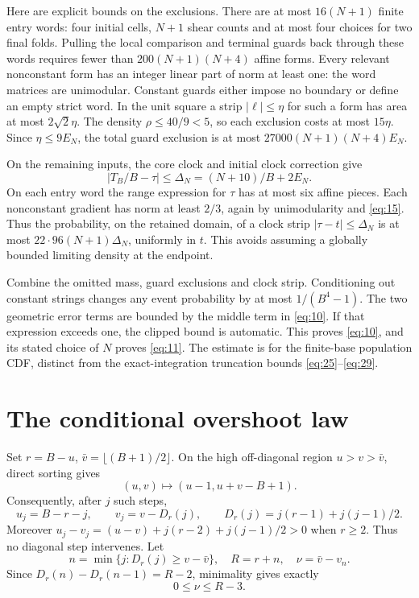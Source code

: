 \documentclass[11pt]{amsart}
\begin{document}
Here are explicit bounds on the exclusions. There are at most \(16(N+1)\) finite entry words: four initial cells, \(N+1\) shear counts and at most four choices for two final folds. Pulling the local comparison and terminal guards back through these words requires fewer than \(200(N+1)(N+4)\) affine forms. Every relevant nonconstant form has an integer linear part of norm at least one: the word matrices are unimodular. Constant guards either impose no boundary or define an empty strict word. In the unit square a strip \(|\ell|\le\eta\) for such a form has area at most \(2\sqrt2\eta\). The density \(\rho\le40/9<5\), so each exclusion costs at most \(15\eta\). Since \(\eta\le9E_N\), the total guard exclusion is at most \(27000(N+1)(N+4)E_N\).

On the remaining inputs, the core clock and initial clock correction give \begin{equation}\label{eq:39}
|T_B/B-\tau|\le\Delta_N=(N+10)/B+2E_N.
\end{equation} On each entry word the range expression for \(\tau\) has at most six affine pieces. Each nonconstant gradient has norm at least \(2/3\), again by unimodularity and \eqref{eq:15}. Thus the probability, on the retained domain, of a clock strip \(|\tau-t|\le\Delta_N\) is at most \(22\cdot96(N+1)\Delta_N\), uniformly in \(t\). This avoids assuming a globally bounded limiting density at the endpoint.

Combine the omitted mass, guard exclusions and clock strip. Conditioning out constant strings changes any event probability by at most \(1/(B^4-1)\). The two geometric error terms are bounded by the middle term in \eqref{eq:10}. If that expression exceeds one, the clipped bound is automatic. This proves \eqref{eq:10}, and its stated choice of \(N\) proves \eqref{eq:11}. The estimate is for the finite-base population CDF, distinct from the exact-integration truncation bounds \eqref{eq:25}--\eqref{eq:29}.

\section{The conditional overshoot law}

Set \(r=B-u\), \(\bar v=\lfloor(B+1)/2\rfloor\). On the high off-diagonal region \(u>v>\bar v\), direct sorting gives \[(u,v)\mapsto(u-1,u+v-B+1).\] Consequently, after \(j\) such steps, \begin{equation}\label{eq:40}
u_j=B-r-j,\qquad v_j=v-D_r(j),\qquad
 D_r(j)=j(r-1)+j(j-1)/2.
\end{equation} Moreover \(u_j-v_j=(u-v)+j(r-2)+j(j-1)/2>0\) when \(r\ge2\). Thus no diagonal step intervenes. Let \[n=\min\{j:D_r(j)\ge v-\bar v\},\quad R=r+n,\quad
 \nu=\bar v-v_n.\] Since \(D_r(n)-D_r(n-1)=R-2\), minimality gives exactly \begin{equation}\label{eq:41}
0\le\nu\le R-3.
\end{equation}
\end{document}

